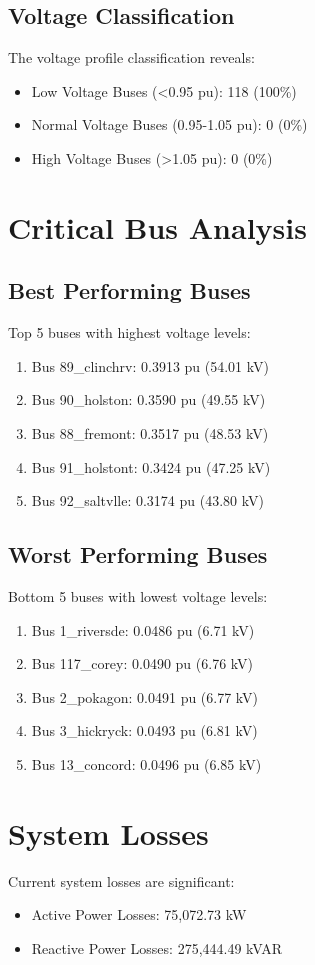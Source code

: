 \documentclass[11pt]{article}
\begin{document}
\subsection{Voltage Classification}
The voltage profile classification reveals:
\begin{itemize}
    \item Low Voltage Buses (<0.95 pu): 118 (100\%)
    \item Normal Voltage Buses (0.95-1.05 pu): 0 (0\%)
    \item High Voltage Buses (>1.05 pu): 0 (0\%)
\end{itemize}

\section{Critical Bus Analysis}
\subsection{Best Performing Buses}
Top 5 buses with highest voltage levels:
\begin{enumerate}
    \item Bus 89\_clinchrv: 0.3913 pu (54.01 kV)
    \item Bus 90\_holston: 0.3590 pu (49.55 kV)
    \item Bus 88\_fremont: 0.3517 pu (48.53 kV)
    \item Bus 91\_holstont: 0.3424 pu (47.25 kV)
    \item Bus 92\_saltvlle: 0.3174 pu (43.80 kV)
\end{enumerate}

\subsection{Worst Performing Buses}
Bottom 5 buses with lowest voltage levels:
\begin{enumerate}
    \item Bus 1\_riversde: 0.0486 pu (6.71 kV)
    \item Bus 117\_corey: 0.0490 pu (6.76 kV)
    \item Bus 2\_pokagon: 0.0491 pu (6.77 kV)
    \item Bus 3\_hickryck: 0.0493 pu (6.81 kV)
    \item Bus 13\_concord: 0.0496 pu (6.85 kV)
\end{enumerate}

\section{System Losses}
Current system losses are significant:
\begin{itemize}
    \item Active Power Losses: 75,072.73 kW
    \item Reactive Power Losses: 275,444.49 kVAR
\end{itemize}
\end{document}
